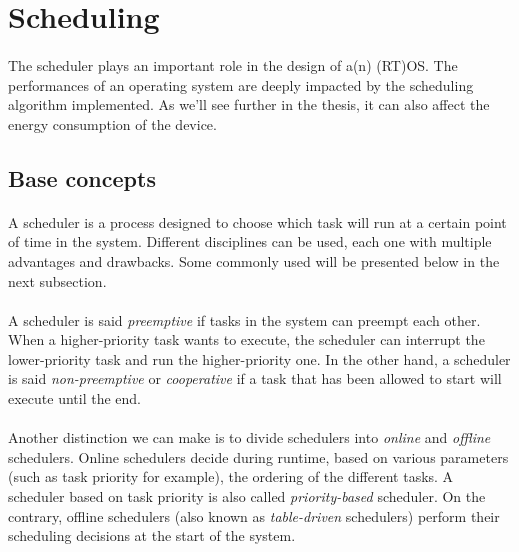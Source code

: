 \section{Scheduling}

\paragraph{}
The scheduler plays an important role in the design of a(n) (RT)OS.
The performances of an operating system are deeply impacted by the scheduling algorithm implemented.
As we'll see further in the thesis, it can also affect the energy consumption of the device.\\

\subsection{Base concepts}

\paragraph{}
A scheduler is a process designed to choose which task will run at a certain point of time in the system.
Different disciplines can be used, each one with multiple advantages and drawbacks.
Some commonly used will be presented below in the next subsection.

\paragraph{}
A scheduler is said \textit{preemptive} if tasks in the system can preempt each other.
When a higher-priority task wants to execute, the scheduler can interrupt the lower-priority task and run the higher-priority one.
In the other hand, a scheduler is said \textit{non-preemptive} or \textit{cooperative}
    if a task that has been allowed to start will execute until the end.

\paragraph{}
Another distinction we can make is to divide schedulers into \textit{online} and \textit{offline} schedulers.
Online schedulers decide during runtime, based on various parameters (such as task priority for example), the ordering of the different tasks.
A scheduler based on task priority is also called \textit{priority-based} scheduler.
On the contrary, offline schedulers (also known as \textit{table-driven} schedulers) perform their scheduling decisions at the start of the system.

